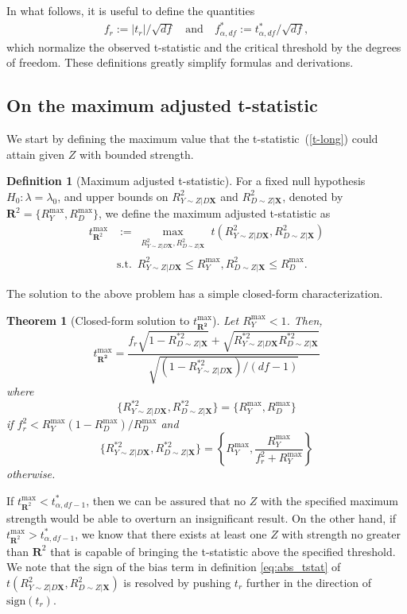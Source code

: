 \documentclass[sts]{imsart}
\theoremstyle{plain}
\newtheorem{theorem}{Theorem}
\theoremstyle{definition}
\newtheorem{definition}{Definition}
\newcommand{\df}{df}
\newcommand{\tmax}{t_{\boldsymbol{R}^2}^{\max}}
\newcommand{\R}{\boldsymbol{R}}
\newcommand{\Ry}{R^2_{Y\sim Z | D\mathbf{X}}}
\newcommand{\Rd}{R^2_{D\sim Z | \mathbf{X}}}
\newcommand{\Rymax}{R^{\max }_{Y}}
\newcommand{\Rdmax}{R^{\max }_{D}}
\newcommand{\tstar}{t^*_{\alpha, \df-1}}
\newcommand{\Rystar}{R^{* 2}_{Y\sim Z | D\mathbf{X}}}
\newcommand{\Rdstar}{R^{* 2}_{D\sim Z | \mathbf{X}}}
\begin{document}
In what follows, it is useful to define the quantities
\begin{align*}
        f_{r} := |t_{r}| / \sqrt{\df} \quad \text{and} \quad f^*_{\alpha, \df} := t^*_{\alpha, \df} / \sqrt{\df},
\end{align*}
%
which normalize the observed t-statistic and the critical threshold by the degrees of freedom. These definitions greatly simplify formulas and derivations. 

\subsection{On the maximum adjusted {t}-statistic}

We start by defining the maximum value that the t-statistic~(\ref{t-long}) could attain given $Z$ with  bounded strength.
    
\begin{definition}[Maximum adjusted t-statistic] For a fixed null hypothesis $H_0:\lambda = \lambda_0$, and  upper bounds on $\Ry$ and $\Rd$, denoted by $\R^2 = \{\Rymax,\Rdmax\}$, we define the maximum adjusted t-statistic as
\begin{align*}
    \tmax &:= \max_{\substack{\Ry, \Rd}} t(\Ry, \Rd)\\
    &\text{s.t.} \enspace \Ry \leq \Rymax, \Rd \leq \Rdmax.
\end{align*}
\end{definition}

 The solution to the above problem has a simple closed-form characterization. 

\begin{theorem}[Closed-form solution to $t_{\boldsymbol{R^2}}^{\max}$]
\label{thm:t-max}
Let $\Rymax < 1$. Then,
$$
{ \textstyle t_{\boldsymbol{R^2}}^{\max} =  \frac{f_{r} \sqrt{1-\Rdstar} + \sqrt{\Rystar\Rdstar}}{\sqrt{(1-\Rystar) / (\df-1)}} }
$$
where 
$$
{ \textstyle  \{\Rystar, \Rdstar\} =  \{\Rymax, \Rdmax \} }
$$
if $f_{r} ^2 < \Rymax(1-\Rdmax)/\Rdmax$ and 
$$
{ \textstyle  \{\Rystar, \Rdstar\} =  \left\{\Rymax, \frac{\Rymax}{f_{r} ^2 + \Rymax}\right\} }
$$
otherwise.
\end{theorem}

If $\tmax < \tstar$, then we can be assured that no $Z$ with the specified maximum strength would be able to overturn an insignificant result. On the other hand, if $\tmax > \tstar$, we know that there exists at least one $Z$ with strength no greater than $\R^2$ that is capable of bringing the t-statistic above the specified threshold. We note that the sign of the bias term in definition \eqref{eq:abs_tstat} of $t(\Ry, \Rd)$ is resolved by pushing $t_r$ further in the direction of $\text{sign}(t_r)$. 
\end{document}
